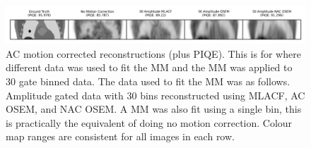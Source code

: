             \begin{figure}
                \centering
                
                \includegraphics[width=1.0\linewidth]{figures/motion_correction_2_results_2_30_amplitude_visual_analysis.png}
                
                \captionsetup{singlelinecheck=false}
                \caption{
                    \gls{AC} motion corrected reconstructions (plus \gls{PIQE}). This is for where different data was used to fit the \gls{MM} and the \gls{MM} was applied to $30$ gate binned data. The data used to fit the \gls{MM} was as follows. Amplitude gated data with $30$ bins reconstructed using \gls{MLACF}, \gls{AC} \gls{OSEM}, and \gls{NAC} \gls{OSEM}. A \gls{MM} was also fit using a single bin, this is practically the equivalent of doing no motion correction. Colour map ranges are consistent for all images in each row.
                }
                
                \label{fig:evaluation_of_pet_ct_motion_correction_incorporating_motion_models_using_mlacf_and_complex_gating_schemes_results_30_amplitude_visual_analysis}
            \end{figure}

